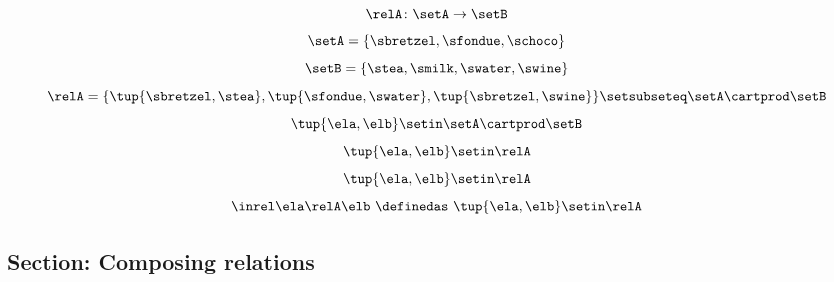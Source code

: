 \begin{forslides}

\begin{equation}\label{eq:slides_session2_76}
\relA \colon \setA \to \setB
\end{equation}
 \begin{equation}\label{eq:slides_session2_77}
\setA = \{ \sbretzel, \sfondue, \schoco \}
\end{equation}
\begin{equation}\label{eq:slides_session2_78}
\setB = \{ \stea, \smilk, \swater, \swine \}
\end{equation}
 \begin{equation}\label{eq:slides_session2_79}
\relA = \{ \tup{\sbretzel, \stea}, \tup{\sfondue, \swater}, \tup{\sbretzel, \swine} \} \setsubseteq \setA \cartprod \setB
\end{equation}
 \begin{equation}\label{eq:slides_session2_80}
\tup{\ela,\elb} \setin \setA \cartprod \setB
\end{equation}
 \begin{equation}\label{eq:slides_session2_81}
\tup{\ela,\elb} \setin \relA
\end{equation}
\begin{equation}\label{eq:slides_session2_82}
\tup{\ela,\elb}\setin \relA
\end{equation}
 \begin{equation}\label{eq:slides_session2_83}
\inrel \ela \relA \elb \ \definedas\  \tup{\ela,\elb}\setin \relA
\end{equation}

\subsection{Section: Composing relations}  


\end{forslides}
